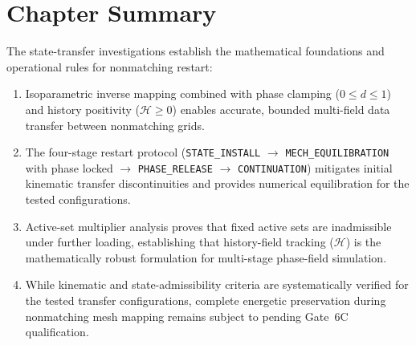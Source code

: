 \section{Chapter Summary}
\label{sec:transfer_summary}

The state-transfer investigations establish the mathematical foundations and operational rules for nonmatching restart:
\begin{enumerate}
    \item Isoparametric inverse mapping combined with phase clamping ($0 \le d \le 1$) and history positivity ($\mathcal{H} \ge 0$) enables accurate, bounded multi-field data transfer between nonmatching grids.
    \item The four-stage restart protocol (\texttt{STATE\_INSTALL} $\to$ \texttt{MECH\_EQUILIBRATION} with phase locked $\to$ \texttt{PHASE\_RELEASE} $\to$ \texttt{CONTINUATION}) mitigates initial kinematic transfer discontinuities and provides numerical equilibration for the tested configurations.
    \item Active-set multiplier analysis proves that fixed active sets are inadmissible under further loading, establishing that history-field tracking ($\mathcal{H}$) is the mathematically robust formulation for multi-stage phase-field simulation.
    \item While kinematic and state-admissibility criteria are systematically verified for the tested transfer configurations, complete energetic preservation during nonmatching mesh mapping remains subject to pending Gate~6C qualification.
\end{enumerate}

